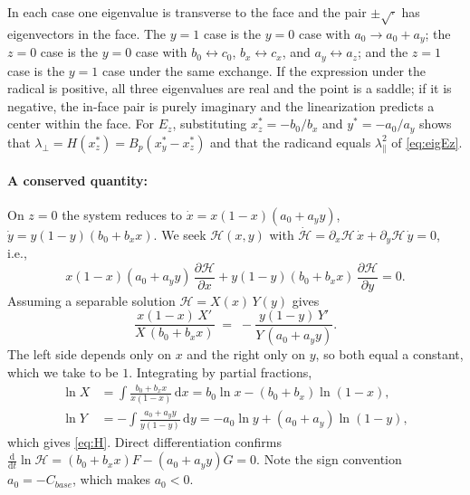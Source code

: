 \documentclass[10pt]{article}
\begin{document}
\begin{appendices}
In each case one eigenvalue is transverse to the face and the pair $\pm\sqrt{\cdot}$ has eigenvectors in the face. The $y=1$ case is the $y=0$ case with $a_0\to a_0+a_y$; the $z=0$ case is the $y=0$ case with $b_0\leftrightarrow c_0$, $b_x\leftrightarrow c_x$, and $a_y\leftrightarrow a_z$; and the $z=1$ case is the $y=1$ case under the same exchange. If the expression under the radical is positive, all three eigenvalues are real and the point is a saddle; if it is negative, the in-face pair is purely imaginary and the linearization predicts a center within the face. For $E_z$, substituting $x_z^*=-b_0/b_x$ and $y^*=-a_0/a_y$ shows that $\lambda_\perp=H(x_z^*)=B_p(x_y^*-x_z^*)$ and that the radicand equals $\lambda_\parallel^2$ of \cref{eq:eigEz}.

\paragraph{A conserved quantity:} On $z=0$ the system reduces to $\dot x=x(1-x)(a_0+a_y y)$, $\dot y=y(1-y)(b_0+b_x x)$. We seek $\mathcal{H}(x,y)$ with $\dot{\mathcal{H}}=\partial_x\mathcal{H}\,\dot x+\partial_y\mathcal{H}\,\dot y=0$, i.e.,
\begin{equation*}
x(1-x)(a_0+a_y y)\,\frac{\partial \mathcal{H}}{\partial x} + y(1-y)(b_0+b_x x)\,\frac{\partial \mathcal{H}}{\partial y} = 0 .
\end{equation*}
Assuming a separable solution $\mathcal{H}=X(x)\,Y(y)$ gives
\begin{equation*}
\frac{x(1-x)\,X'}{X\,(b_0+b_x x)} \;=\; -\frac{y(1-y)\,Y'}{Y\,(a_0+a_y y)} .
\end{equation*}
The left side depends only on $x$ and the right only on $y$, so both equal a constant, which we take to be $1$. Integrating by partial fractions,
\begin{align*}
\ln X&=\int\frac{b_0+b_x x}{x(1-x)}\,\mathrm{d} x = b_0\ln x-(b_0+b_x)\ln(1-x),\\
\ln Y&=-\int\frac{a_0+a_y y}{y(1-y)}\,\mathrm{d} y = -a_0\ln y+(a_0+a_y)\ln(1-y),
\end{align*}
which gives \cref{eq:H}. Direct differentiation confirms $\tfrac{\mathrm{d}}{\mathrm{d}t}\ln\mathcal{H}=(b_0+b_x x)F-(a_0+a_y y)G=0$. Note the sign convention $a_0=-C_{base}$, which makes $a_0<0$.


\end{appendices}
\end{document}
